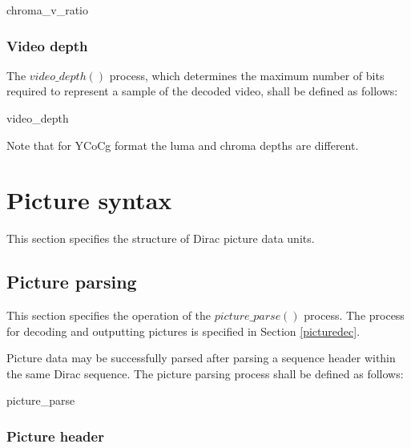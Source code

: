 \begin{pseudo}{chroma\_v\_ratio}{}
\bsRET{\LumaHeight//\ChromaHeight}
\end{pseudo}

\subsubsection{Video depth}
\label{videodepth}
The $video\_depth()$ process, which determines the maximum number of bits required to represent a sample of the decoded video, shall be defined as follows:

\begin{pseudo}{video\_depth}{\VideoParams}
\end{pseudo}

Note that for YCoCg format the luma and chroma depths are different.

\section{Picture syntax}
\label{picturesyntax}
This section specifies the structure of Dirac picture data units.

\subsection{Picture parsing}
\label{picture}
\label{pictureparse}

This section specifies the operation of the $picture\_parse()$ process. The process for
decoding and outputting pictures is specified in Section \ref{picturedec}.

Picture data may be successfully parsed after parsing a sequence header within the 
same  Dirac sequence. The picture parsing process shall be defined as follows:

\begin{pseudo}{picture\_parse}{}
\bsEND
{}
\end{pseudo}

\subsubsection{Picture header}
\label{pictureheader}


